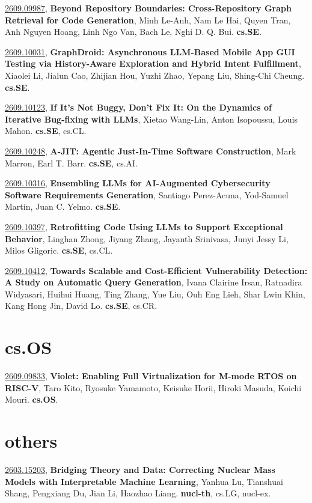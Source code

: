 \documentclass[9pt, a4paper]{article}
\theoremstyle{plain}
\theoremstyle{definition}
\theoremstyle{remark}
\newcommand{\arxivwithtarget}[3]{\hypertarget{#1}{}\href{https://arxiv.org/abs/#1}{#1}, \textbf{\textcolor{arxivblue}{#2}}, #3. }
\begin{document}
\arxivwithtarget{2609.09987}{Beyond Repository Boundaries: Cross-Repository Graph Retrieval for Code Generation}{Minh Le-Anh, Nam Le Hai, Quyen Tran, Anh Nguyen Hoang, Linh Ngo Van, Bach Le, Nghi D. Q. Bui}\textbf{cs.SE}.



\arxivwithtarget{2609.10031}{GraphDroid: Asynchronous LLM-Based Mobile App GUI Testing via History-Aware Exploration and Hybrid Intent Fulfillment}{Xiaolei Li, Jialun Cao, Zhijian Hou, Yuzhi Zhao, Yepang Liu, Shing-Chi Cheung}\textbf{cs.SE}.



\arxivwithtarget{2609.10123}{If It's Not Buggy, Don't Fix It: On the Dynamics of Iterative Bug-fixing with LLMs}{Xietao Wang-Lin, Anton Isopoussu, Louis Mahon}\textbf{cs.SE}, cs.CL.



\arxivwithtarget{2609.10248}{A-JIT: Agentic Just-In-Time Software Construction}{Mark Marron, Earl T. Barr}\textbf{cs.SE}, cs.AI.



\arxivwithtarget{2609.10316}{Ensembling LLMs for AI-Augmented Cybersecurity Software Requirements Generation}{Santiago Perez-Acuna, Yod-Samuel Martín, Juan C. Yelmo}\textbf{cs.SE}.



\arxivwithtarget{2609.10397}{Retrofitting Code Using LLMs to Support Exceptional Behavior}{Linghan Zhong, Jiyang Zhang, Jayanth Srinivasa, Junyi Jessy Li, Milos Gligoric}\textbf{cs.SE}, cs.CL.



\arxivwithtarget{2609.10412}{Towards Scalable and Cost-Efficient Vulnerability Detection: A Study on Automatic Query Generation}{Ivana Clairine Irsan, Ratnadira Widyasari, Huihui Huang, Ting Zhang, Yue Liu, Ouh Eng Lieh, Shar Lwin Khin, Kang Hong Jin, David Lo}\textbf{cs.SE}, cs.CR.



\section{cs.OS}
\arxivwithtarget{2609.09833}{Violet: Enabling Full Virtualization for M-mode RTOS on RISC-V}{Taro Kito, Ryosuke Yamamoto, Keisuke Horii, Hiroki Masuda, Koichi Mouri}\textbf{cs.OS}.



\section{others}
\arxivwithtarget{2603.15203}{Bridging Theory and Data: Correcting Nuclear Mass Models with Interpretable Machine Learning}{Yanhua Lu, Tianshuai Shang, Pengxiang Du, Jian Li, Haozhao Liang}\textbf{nucl-th}, cs.LG, nucl-ex.
\end{document}
